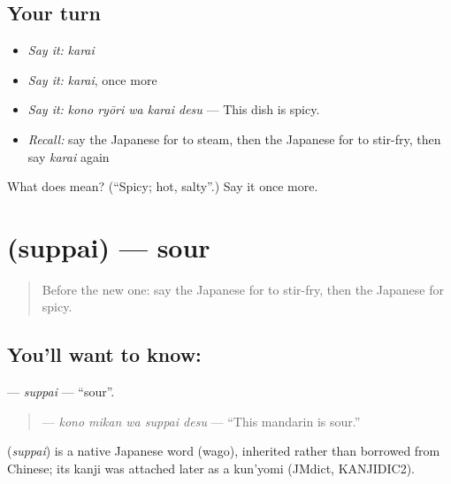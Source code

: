 \subsection*{Your turn}
\begin{itemize}
\raggedright
  \item \emph{Say it:} \emph{karai}
  \item \emph{Say it:} \emph{karai}, once more
  \item \emph{Say it:} \emph{kono ryōri wa karai desu} — This dish is spicy.
  \item \emph{Recall:} say the Japanese for to steam, then the Japanese for to stir-fry, then say \emph{karai} again
\end{itemize}

\begin{tcolorbox}[breakable,colback=teal!4,colframe=teal!35!black,title={Before you move on}]
What does  mean? (\textquotedblleft{}Spicy; hot, salty\textquotedblright{}.) Say it once more.
\end{tcolorbox}
\section[\texorpdfstring{\ja{すっぱい} (suppai)}{すっぱい (suppai)}]{ (suppai) — sour}

\label{lesson:JA-C177-suppai}



\begin{quote}
Before the new one: say the Japanese for to stir-fry, then the Japanese for spicy.
\end{quote}

\subsection*{You'll want to know: }
\textbf{} — \emph{suppai} — \textquotedblleft{}sour\textquotedblright{}.

\begin{quote}
\textbf{  } — \emph{kono mikan wa suppai desu} — \textquotedblleft{}This mandarin is sour.\textquotedblright{}
\end{quote}

\begin{cousinweb}
\textbf{} (\emph{suppai}) is a native Japanese word (wago), inherited rather than borrowed from Chinese; its kanji was attached later as a kun'yomi (JMdict, KANJIDIC2).
\end{cousinweb}

